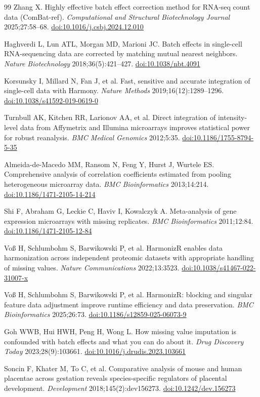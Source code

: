 \documentclass[11pt,a4paper]{article}
\newcommand{\doi}[1]{\href{https://doi.org/#1}{doi:#1}}
\begin{document}
\begin{thebibliography}{99}
Zhang X.
Highly effective batch effect correction method for RNA-seq count
data (ComBat-ref).
\textit{Computational and Structural Biotechnology Journal}
2025;27:58--68.
\doi{10.1016/j.csbj.2024.12.010}

Haghverdi L, Lun ATL, Morgan MD, Marioni JC.
Batch effects in single-cell RNA-sequencing data are corrected by
matching mutual nearest neighbors.
\textit{Nature Biotechnology} 2018;36(5):421--427.
\doi{10.1038/nbt.4091}

Korsunsky I, Millard N, Fan J, et al.
Fast, sensitive and accurate integration of single-cell data with
Harmony.
\textit{Nature Methods} 2019;16(12):1289--1296.
\doi{10.1038/s41592-019-0619-0}

Turnbull AK, Kitchen RR, Larionov AA, et al.
Direct integration of intensity-level data from Affymetrix and
Illumina microarrays improves statistical power for robust
reanalysis.
\textit{BMC Medical Genomics} 2012;5:35.
\doi{10.1186/1755-8794-5-35}

Almeida-de-Macedo MM, Ransom N, Feng Y, Hurst J, Wurtele ES.
Comprehensive analysis of correlation coefficients estimated from
pooling heterogeneous microarray data.
\textit{BMC Bioinformatics} 2013;14:214.
\doi{10.1186/1471-2105-14-214}

Shi F, Abraham G, Leckie C, Haviv I, Kowalczyk A.
Meta-analysis of gene expression microarrays with missing
replicates.
\textit{BMC Bioinformatics} 2011;12:84.
\doi{10.1186/1471-2105-12-84}

Vo{\ss} H, Schlumbohm S, Barwikowski P, et al.
HarmonizR enables data harmonization across independent proteomic
datasets with appropriate handling of missing values.
\textit{Nature Communications} 2022;13:3523.
\doi{10.1038/s41467-022-31007-x}

Vo{\ss} H, Schlumbohm S, Barwikowski P, et al.
HarmonizR: blocking and singular feature data adjustment improve
runtime efficiency and data preservation.
\textit{BMC Bioinformatics} 2025;26:73.
\doi{10.1186/s12859-025-06073-9}

Goh WWB, Hui HWH, Peng H, Wong L.
How missing value imputation is confounded with batch effects and
what you can do about it.
\textit{Drug Discovery Today} 2023;28(9):103661.
\doi{10.1016/j.drudis.2023.103661}


Soncin F, Khater M, To C, et al.
Comparative analysis of mouse and human placentae across gestation
reveals species-specific regulators of placental development.
\textit{Development} 2018;145(2):dev156273.
\doi{10.1242/dev.156273}


\end{thebibliography}
\end{document}
